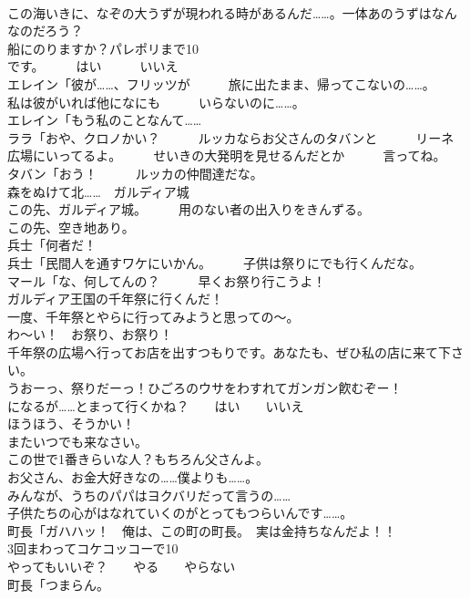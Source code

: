 \documentclass[8pt]{extreport}
\begin{document}
\begin{CJK}{UTF8}{min}
\\	この海いきに、なぞの大うずが現われる時があるんだ……。一体あのうずはなんなのだろう？	
\\	船にのりますか？パレポリまで10
\\	です。　　　はい　　　いいえ	
\\	エレイン「彼が……、フリッツが　　　旅に出たまま、帰ってこないの……。　　　私は彼がいれば他になにも　　　いらないのに……。	
\\	エレイン「もう私のことなんて……	
\\	ララ「おや、クロノかい？　　　ルッカならお父さんのタバンと　　　リーネ広場にいってるよ。　　　せいきの大発明を見せるんだとか　　　言ってね。	
\\	タバン「おう！　　　ルッカの仲間達だな。	
\\	森をぬけて北……　ガルディア城	
\\	この先、ガルディア城。　　　用のない者の出入りをきんずる。	
\\	この先、空き地あり。	
\\	兵士「何者だ！	
\\	兵士「民間人を通すワケにいかん。　　　子供は祭りにでも行くんだな。	
\\	マール「な、何してんの？　　　早くお祭り行こうよ！	
\\	ガルディア王国の千年祭に行くんだ！	
\\	一度、千年祭とやらに行ってみようと思っての～。	
\\	わ～い！　お祭り、お祭り！	
\\	千年祭の広場へ行ってお店を出すつもりです。あなたも、ぜひ私の店に来て下さい。	
\\	うおーっ、祭りだーっ！ひごろのウサをわすれてガンガン飮むぞー！	
\\	になるが……とまって行くかね？　　はい　　いいえ	
\\	ほうほう、そうかい！	
\\	またいつでも来なさい。	
\\	この世で1番きらいな人？もちろん父さんよ。	
\\	お父さん、お金大好きなの……僕よりも……。	
\\	みんなが、うちのパパはヨクバリだって言うの……	
\\	子供たちの心がはなれていくのがとってもつらいんです……。	
\\	町長「ガハハッ！　俺は、この町の町長。　実は金持ちなんだよ！！	
\\	3回まわってコケコッコーで10
\\	やってもいいぞ？　　やる　　やらない	
\\	町長「つまらん。	

\end{CJK}
\end{document}
